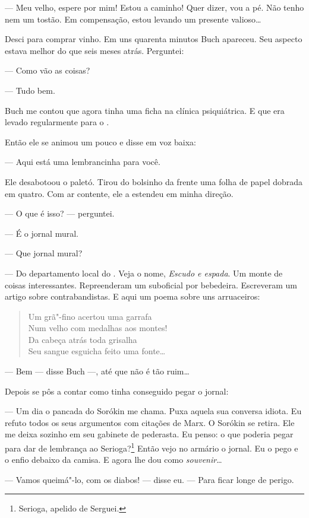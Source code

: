 --- Meu velho, espere por mim! Estou a caminho! Quer dizer, vou a pé.
Não tenho nem um tostão. Em compensação, estou levando um presente
valioso\ldots{}

Desci para comprar vinho. Em uns quarenta minutos Buch apareceu. Seu
aspecto estava melhor do que seis meses atrás. Perguntei:

--- Como vão as coisas?

--- Tudo bem.

Buch me contou que agora tinha uma ficha na clínica psiquiátrica. E que
era levado regularmente para o .

Então ele se animou um pouco e disse em voz baixa:

--- Aqui está uma lembrancinha para você.

Ele desabotoou o paletó. Tirou do bolsinho da frente uma folha de papel
dobrada em quatro. Com ar contente, ele a estendeu em minha direção.

--- O que é isso? --- perguntei.

--- É o jornal mural.

--- Que jornal mural?

--- Do departamento local do . Veja o nome, \emph{Escudo e espada}.
Um monte de coisas interessantes. Repreenderam um suboficial por
bebedeira. Escreveram um artigo sobre contrabandistas. E aqui um poema
sobre uns arruaceiros:

\begin{verse}
Um grã"-fino acertou uma garrafa\\
Num velho com medalhas aos montes!\\
Da cabeça atrás toda grisalha\\
Seu sangue esguicha feito uma fonte\ldots{}
\end{verse}

--- Bem --- disse Buch ---, até que não é tão ruim\ldots{}

Depois se pôs a contar como tinha conseguido pegar o jornal:

--- Um dia o pancada do Sorókin me chama. Puxa aquela sua conversa
idiota. Eu refuto todos os seus argumentos com citações de Marx. O
Sorókin se retira. Ele me deixa sozinho em seu gabinete de pederasta. Eu
penso: o que poderia pegar para dar de lembrança ao Serioga?\footnote{Serioga,
  apelido de Serguei.} Então vejo no armário o jornal. Eu o pego e o
enfio debaixo da camisa. E agora lhe dou como \emph{souvenir}\ldots{}

--- Vamos queimá"-lo, com os diabos! --- disse eu. --- Para ficar longe
de perigo.

